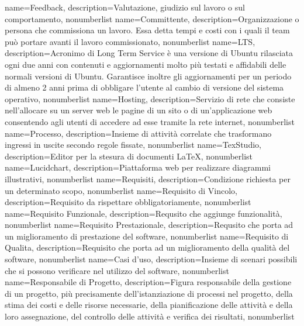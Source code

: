 {
	name={Feedback},
	description={Valutazione, giudizio sul lavoro o sul comportamento},
	nonumberlist 
}
{
	name={Committente},
	description={Organizzazione o persona che commissiona un lavoro. Essa detta tempi e costi con i quali il team può portare avanti il lavoro commissionato},
	nonumberlist 
}
{
	name={LTS},
	description={Acronimo di Long Term Service è una versione di Ubuntu rilasciata ogni due anni con contenuti e aggiornamenti molto più testati e affidabili delle normali versioni di Ubuntu. Garantisce inoltre gli aggiornamenti per un periodo di almeno 2 anni prima di obbligare l'utente al cambio di versione del sistema operativo},
	nonumberlist 
}
{
	name={Hosting},
	description={Servizio di rete che consiste nell'allocare su un server web le pagine di un sito o di un'applicazione web consentendo agli utenti di accedere ad esse tramite la rete internet},
	nonumberlist 
}
{
	name={Processo},
	description={Insieme di attività correlate che trasformano ingressi in uscite secondo regole fissate},
	nonumberlist 
}
{
	name={TexStudio},
	description={Editor per la stesura di documenti \LaTeX},
	nonumberlist 
}
{
	name={Lucidchart},
	description={Piattaforma web per realizzare diagrammi illustrativi},
	nonumberlist 
}
{
	name={Requisiti},
	description={Condizione richiesta per un determinato scopo},
	nonumberlist 
}
{
	name={Requisito di Vincolo},
	description={Requisito da rispettare obbligatoriamente},
	nonumberlist 
}
{
	name={Requisito Funzionale},
	description={Requsito che aggiunge funzionalità},
	nonumberlist 
}
{
	name={Requisito Prestazionale},
	description={Requsito che porta ad un miglioramento di prestazione del software},
	nonumberlist 
}
{
	name={Requisito di Qualita},
	description={Requisito che porta ad un miglioramento della qualità del software},
	nonumberlist 
}
{
	name={Casi d'uso},
	description={Insieme di scenari possibili che si possono verificare nel	utilizzo del software},
	nonumberlist 
}
{
	name={Responsabile di Progetto},
	description={Figura responsabile della gestione di un progetto, più precisamente dell'istanziazione di processi nel progetto, della stima dei costi e delle risorse necessarie, della pianificazione delle attività e della loro assegnazione, del controllo delle attività e verifica dei risultati},
	nonumberlist 
}
